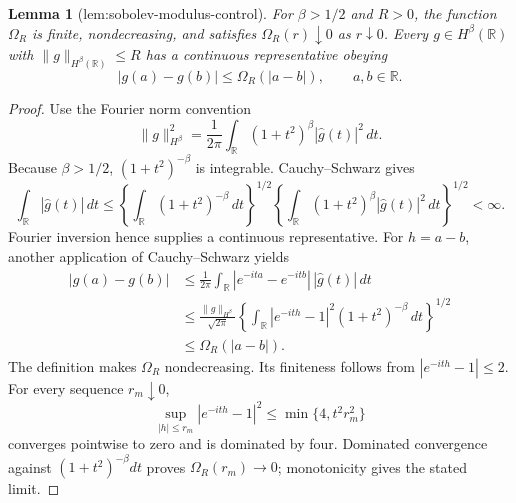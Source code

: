 \documentclass{article}
\newtheorem{lemma}{Lemma}
\begin{document}
\begin{lemma}[lem:sobolev-modulus-control]\label{lem:sobolev-modulus-control}
For \(\beta>1/2\) and \(R>0\), the function \(\Omega_R\) is finite, nondecreasing, and satisfies \(\Omega_R(r)\downarrow0\) as \(r\downarrow0\). Every \(g\in H^\beta(\mathbb R)\) with \(\|g\|_{H^\beta(\mathbb R)}\le R\) has a continuous representative obeying
\[
 |g(a)-g(b)|\le\Omega_R(|a-b|),\qquad a,b\in\mathbb R.
\]
\end{lemma}
\begin{proof}
Use the Fourier norm convention
\[
 \|g\|_{H^\beta}^2=\frac1{2\pi}
 \int_{\mathbb R}(1+t^2)^\beta|\widehat g(t)|^2\,dt.
\]
Because \(\beta>1/2\), \((1+t^2)^{-\beta}\) is integrable. Cauchy--Schwarz gives
\[
 \int_{\mathbb R}|\widehat g(t)|\,dt
 \le
 \left\{\int_{\mathbb R}(1+t^2)^{-\beta}\,dt\right\}^{1/2}
 \left\{\int_{\mathbb R}(1+t^2)^\beta|\widehat g(t)|^2\,dt\right\}^{1/2}<\infty.
\]
Fourier inversion hence supplies a continuous representative. For \(h=a-b\), another application of Cauchy--Schwarz yields
\[
 \begin{aligned}
 |g(a)-g(b)|
 &\le \frac1{2\pi}\int_{\mathbb R}
       |e^{-ita}-e^{-itb}|\,|\widehat g(t)|\,dt\\
 &\le \frac{\|g\|_{H^\beta}}{\sqrt{2\pi}}
 \left\{\int_{\mathbb R}|e^{-ith}-1|^2(1+t^2)^{-\beta}\,dt\right\}^{1/2}\\
 &\le \Omega_R(|a-b|).
 \end{aligned}
\]
The definition makes \(\Omega_R\) nondecreasing. Its finiteness follows from \(|e^{-ith}-1|\le2\). For every sequence \(r_m\downarrow0\),
\[
 \sup_{|h|\le r_m}|e^{-ith}-1|^2\le\min\{4,t^2r_m^2\}
\]
converges pointwise to zero and is dominated by four. Dominated convergence against \((1+t^2)^{-\beta}dt\) proves \(\Omega_R(r_m)\to0\); monotonicity gives the stated limit.
\end{proof}
\end{document}
